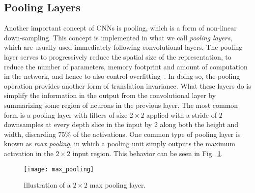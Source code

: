 \documentclass[../main.tex]{subfiles}
\begin{document}
\subsection{Pooling Layers}
Another important concept of CNNs is pooling, which is a form of non-linear
down-sampling.
%
This concept is implemented in what we call \emph{pooling layers}, which are
usually used immediately following convolutional layers.
%
The pooling layer serves to progressively reduce the spatial size of the
representation, to reduce the number of parameters, memory footprint and amount
of computation in the network, and hence to also control
overfitting~\cite{scherer2010evaluation,2014arXiv1412.6806S}.
%
In doing so, the pooling operation provides another form of translation
invariance.
%
What these layers do is simplify the information in the output from the
convolutional layer by summarizing some region of neurons in the previous
layer.
%
The most common form is a pooling layer with filters of size $2\times2$ applied
with a stride of $2$ downsamples at every depth slice in the input by $2$ along
both the height and width, discarding $75\%$ of the activations.
%
One common type of pooling layer is known as \emph{max pooling}, in which a
pooling unit simply outputs the maximum activation in the $2\times2$ input
region.
%
This behavior can be seen in Fig.~\ref{fig:max_pool}.
%
\begin{figure}[htpb]
  \centering
  \texttt{[image: max\_pooling]}
  \caption{Illustration of a $2\times2$ max pooling layer.}%
\label{fig:max_pool}
\end{figure}
%
\end{document}
